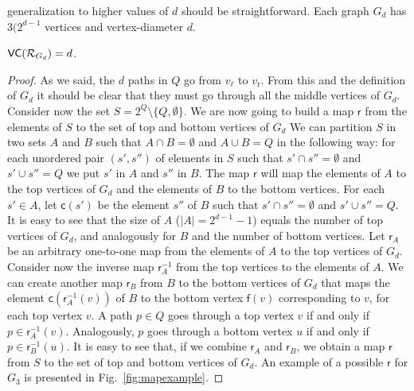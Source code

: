 generalization to higher values of $d$ should be straightforward. Each graph
$G_d$ has $3(2^{d-1}$ vertices and vertex-diameter $d$.
\fi
\begin{lemma}\label{lem:vcdimlowbound}
  $\mathsf{VC}(\mathcal{R}_{G_d})=d$.
\end{lemma}
\ifproof
\begin{proof}
  As we said, the $d$ paths in $Q$  go from $v_\ell$ to $v_\mathrm{r}$.
  From this and the definition of $G_d$ it should be clear that they must go through
  all the middle vertices of $G_d$. Consider now the set
  $S=2^Q\setminus\{Q,\emptyset\}$. We are now going to build a map $\mathsf{r}$
  from the elements of $S$ to the set of top and bottom vertices of $G_d$ We can
  partition $S$ in two sets $A$ and $B$ such that $A\cap B=\emptyset$ and $A\cup
  B=Q$ in the following way: for each unordered pair $(s',s'')$ of
  elements in $S$ such that $s'\cap s''=\emptyset$ and $s'\cup s''=Q$
  we put $s'$ in $A$ and $s''$ in $B$. The map $\mathsf{r}$ will map the
  elements of $A$ to the top vertices of $G_d$ and the elements of $B$ to the
  bottom vertices. For each $s'\in A$, let $\mathsf{c}(s')$ be the element $s''$
  of $B$ such that $s'\cap s''=\emptyset$ and $s'\cup s''=Q$. It is
  easy to see that the size of $A$ ($|A|=2^{d-1}-1$) equals the number of top
  vertices of $G_d$, and analogously for $B$ and the number of bottom vertices.
  Let $\mathsf{r}_A$ be an arbitrary one-to-one map from the elements of $A$ to
  the top vertices of $G_d$. Consider now the inverse map $\mathsf{r}^{-1}_A$
  from the top vertices to the elements of $A$. We can create another map
  $\mathsf{r}_B$ from $B$ to the
  bottom vertices of $G_d$ that maps the element
  $\mathsf{c}(\mathsf{r}^{-1}_A(v))$ of $B$ to the bottom vertex $\mathsf{f}(v)$
  corresponding to $v$, for each top vertex $v$. A path $p\in Q$ goes through
  a top vertex $v$ if and only if $p\in\mathsf{r}^{-1}_A(v)$. Analogously, $p$
  goes through a bottom vertex $u$ if and only if $p\in\mathsf{r}^{-1}_B(u)$.
  It is easy to see that, if we combine $\mathsf{r}_A$ and
  $\mathsf{r}_B$, we obtain a map $\mathsf{r}$ from $S$ to the set of
  top and bottom vertices of $G_d$. An example of a possible $\mathsf{r}$ for
  $G_3$ is presented in Fig.~\ref{fig:mapexample}.


\end{proof}
